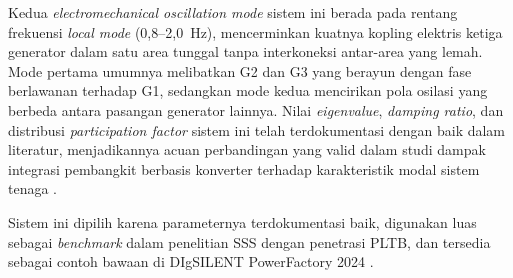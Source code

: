 Kedua \textit{electromechanical oscillation mode} sistem ini berada pada rentang
frekuensi \textit{local mode} (0{,}8--2{,}0~Hz), mencerminkan kuatnya kopling
elektris ketiga generator dalam satu area tunggal tanpa interkoneksi antar-area yang
lemah. Mode pertama umumnya melibatkan G2 dan G3 yang berayun dengan fase berlawanan
terhadap G1, sedangkan mode kedua mencirikan pola osilasi yang berbeda antara pasangan
generator lainnya. Nilai \textit{eigenvalue}, \textit{damping ratio}, dan distribusi
\textit{participation factor} sistem ini telah terdokumentasi dengan baik dalam
literatur, menjadikannya acuan perbandingan yang valid dalam studi dampak integrasi
pembangkit berbasis konverter terhadap karakteristik modal sistem tenaga
\cite{wang2014small,he2015investigation}.

Sistem ini dipilih karena parameternya terdokumentasi baik, digunakan luas sebagai
\textit{benchmark} dalam penelitian SSS dengan penetrasi PLTB, dan tersedia sebagai
contoh bawaan di DIgSILENT PowerFactory 2024
\cite{anderson1977power,wang2014small,he2015investigation,sun2013small}.

